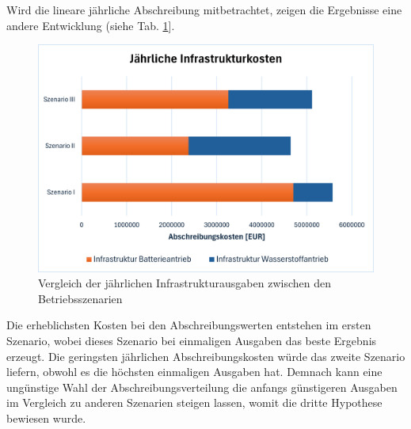 Wird die lineare jährliche Abschreibung mitbetrachtet, 
zeigen die Ergebnisse eine andere Entwicklung (siehe Tab. \ref{res_abschr_betriebsszenarien}]. 
\begin{figure}[h]
	\centering
	\includegraphics[width=0.8\linewidth]{Bilder/infr_abschreibung.png}
	\caption[Vergleich der jährlichen Infrastrukturausgaben zwischen den Betriebsszenarien]{Vergleich der jährlichen Infrastrukturausgaben zwischen den Betriebsszenarien}
	\label{res_abschr_betriebsszenarien}
\end{figure}
Die erheblichsten Kosten bei den Abschreibungswerten entstehen im ersten Szenario, 
wobei dieses Szenario bei einmaligen Ausgaben das beste Ergebnis erzeugt.
Die geringsten jährlichen Abschreibungskosten würde das zweite Szenario liefern, 
obwohl es die höchsten einmaligen Ausgaben hat. 
Demnach kann eine ungünstige Wahl der Abschreibungsverteilung die anfangs günstigeren Ausgaben 
im Vergleich zu anderen Szenarien steigen lassen, womit die dritte Hypothese bewiesen wurde.\\

